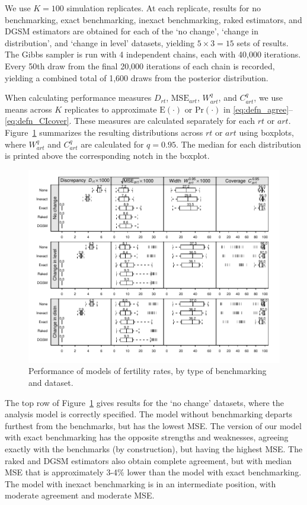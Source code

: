 \documentclass[12pt]{article}
\begin{document}
We use $K = 100$ simulation replicates.  At each replicate, results for no benchmarking, exact benchmarking, inexact benchmarking, raked estimators, and DGSM estimators are obtained for each of the `no change', `change in distribution', and `change in level' datasets, yielding $5 \times 3 = 15$ sets of results.  The Gibbs sampler is run with 4 independent chains, each with 40,000 iterations.  Every 50th draw from the final 20,000 iterations of each chain is recorded, yielding a combined total of 1,600 draws from the posterior distribution.

When calculating performance measures $D_{rt}$, $\text{MSE}_{art}$, $W_{art}^q$, and $C_{art}^q$, we use means across $K$ replicates to approximate $\text{E}(\cdot)$ or $\text{Pr}(\cdot)$ in \eqref{eq:defn_agree}--\eqref{eq:defn_CIcover}.  These measures are calculated separately for each $rt$ or $art$.  Figure~\ref{fig:fertility_performance_all} summarizes the resulting distributions across $rt$ or $art$ using boxplots, where $W_{art}^q$ and $C_{art}^q$ are calculated for $q=0.95$.  The median for each distribution is printed above the corresponding notch in the boxplot.

\begin{figure}
    \centering
    \includegraphics{out/fertility/fertility_performance_all}
    \caption{\small Performance of models of fertility rates, by type of benchmarking and dataset.}
    \label{fig:fertility_performance_all}
\end{figure}

The top row of Figure~\ref{fig:fertility_performance_all} gives results for the `no change' datasets, where the analysis model is correctly specified.  The model without benchmarking departs furthest from the benchmarks, but has the lowest MSE.  The version of our model with exact benchmarking has the opposite strengths and weaknesses, agreeing exactly with the benchmarks (by construction), but having the highest MSE.  The raked and DGSM estimators also obtain complete agreement, but with median MSE that is approximately 3-4\% lower than the model with exact benchmarking.  The model with inexact benchmarking is in an intermediate position, with moderate agreement and moderate MSE.
\end{document}
